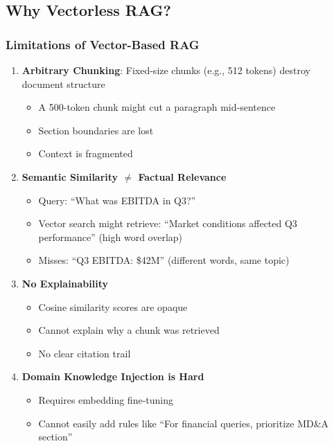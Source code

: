 \documentclass[12pt,a4paper]{article}
\begin{document}
\subsection{Why Vectorless RAG?}

\subsubsection{Limitations of Vector-Based RAG}

\begin{enumerate}
    \item \textbf{Arbitrary Chunking}: Fixed-size chunks (e.g., 512 tokens) destroy document structure
    \begin{itemize}
        \item A 500-token chunk might cut a paragraph mid-sentence
        \item Section boundaries are lost
        \item Context is fragmented
    \end{itemize}
    
    \item \textbf{Semantic Similarity $\neq$ Factual Relevance}
    \begin{itemize}
        \item Query: ``What was EBITDA in Q3?''
        \item Vector search might retrieve: ``Market conditions affected Q3 performance'' (high word overlap)
        \item Misses: ``Q3 EBITDA: \$42M'' (different words, same topic)
    \end{itemize}
    
    \item \textbf{No Explainability}
    \begin{itemize}
        \item Cosine similarity scores are opaque
        \item Cannot explain why a chunk was retrieved
        \item No clear citation trail
    \end{itemize}
    
    \item \textbf{Domain Knowledge Injection is Hard}
    \begin{itemize}
        \item Requires embedding fine-tuning
        \item Cannot easily add rules like ``For financial queries, prioritize MD\&A section''
    \end{itemize}
\end{enumerate}
\end{document}
